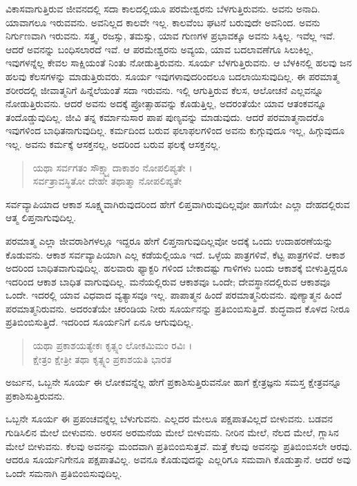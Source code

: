 ವಿಕಾಸವಾಗುತ್ತಿರುವ ಜೀವನದಲ್ಲಿ ಸದಾ ಕಾಲದಲ್ಲಿಯೂ ಪರಮೇಶ್ವರನು ಬೆಳಗುತ್ತಿರುವನು. ಅವನು ಅನಾದಿ. ಯಾವಾಗಲೂ ಇರುವವನು. ಅವನಿಲ್ಲದ ಕಾಲವೇ ಇಲ್ಲ. ಕಾಲವೆಂಬ ಘಟನೆ ಬರುವುದೇ ಅವನಿಂದ. ಅವನು ನಿರ್ಗುಣವಾಗಿ ಇರುವನು. ಸತ್ತ್ವ, ರಜಸ್ಸು, ತಮಸ್ಸು, ಯಾವ ಗುಣಗಳ ಪ್ರಭಾವಕ್ಕೂ ಅವನು ಸಿಕ್ಕಿಲ್ಲ. ಇವೆಲ್ಲ ಇವೆ. ಆದರೆ ಅವನನ್ನು ಬಂಧಿಸಲಾರದೆ ಇವೆ. ಆ ಪರಮೇಶ್ವರನು ಅವ್ಯಯ, ಯಾವ ಬದಲಾವಣೆಗೂ ಸಿಲುಕಿಲ್ಲ, ಇವುಗಳನ್ನೆಲ್ಲ ಕೇವಲ ಸಾಕ್ಷಿಯಂತೆ ನಿಂತು ನೋಡುತ್ತಿರುವನು. ಸೂರ್ಯ ಬೆಳಗುತ್ತಿರುವನು. ಆ ಬೆಳಕಿನಲ್ಲಿ ಹಲವು ಜನ ಹಲವು ಕೆಲಸಗಳನ್ನು ಮಾಡುತ್ತಿರುವರು. ಸೂರ್ಯ ಇವುಗಳಾವುದರಿಂದಲೂ ಬದಲಾಯಿಸುವುದಿಲ್ಲ. ಈ ಪರಮಾತ್ಮ ಶರೀರದಲ್ಲಿ ಜೀವಾತ್ಮನಿಗೆ ಹಿನ್ನೆಲೆಯಂತೆ ಸದಾ ಇರುವನು. ಇಲ್ಲಿ ಆಗುತ್ತಿರುವ ಕೆಲಸ, ಆಲೋಚನೆ ಎಲ್ಲವನ್ನೂ ನೋಡುತ್ತಿರುವನು. ಆದರೆ ಅವನು ಅದಕ್ಕೆ ಪ್ರೋತ್ಸಾಹವನ್ನು ಕೊಡುತ್ತಿಲ್ಲ, ಅದರಂತೆಯೇ ಯಾವ ಆತಂಕವನ್ನೂ ತಂದೊಡ್ಡುವುದಿಲ್ಲ. ಜೀವಿ ತನ್ನ ಕರ್ಮಾನುಸಾರ ಪಾಪ ಪುಣ್ಯವನ್ನು ಮಾಡುವುದು. ಆದರೆ ಪರಮಾತ್ಮನಾದರೊ ಇವುಗಳಿಂದ ಬಾಧಿತನಾಗುವುದಿಲ್ಲ. ಕರ್ಮದಿಂದ ಬರುವ ಫಲಾಫಲಗಳಿಂದ ಅವನು ಕುಗ್ಗುವುದೂ ಇಲ್ಲ, ಹಿಗ್ಗುವುದೂ ಇಲ್ಲ. ಅವನು ಕರ್ಮಕ್ಕೆ ಆಸಕ್ತನಲ್ಲ, ಅದರಿಂದ ಬರುವ ಫಲಕ್ಕೆ ಆಸಕ್ತನಲ್ಲ.

\begin{verse}
ಯಥಾ ಸರ್ವಗತಂ ಸೌಕ್ಷ್ಮ್ಯಾದಾಕಾಶಂ ನೋಪಲಿಪ್ಯತೇ ।\\ಸರ್ವತ್ರಾವಸ್ಥಿತೋ ದೇಹೇ ತಥಾತ್ಮಾ ನೋಪಲಿಪ್ಯತೇ 
\end{verse}

{\small ಸರ್ವವ್ಯಾಪಿಯಾದ ಆಕಾಶ ಸೂಕ್ಷ್ಮವಾಗಿರುವುದರಿಂದ ಹೇಗೆ ಲಿಪ್ತವಾಗಿರುವುದಿಲ್ಲವೋ ಹಾಗೆಯೇ ಎಲ್ಲಾ ದೇಹದಲ್ಲಿರುವ ಆತ್ಮ ಲಿಪ್ತನಾಗುವುದಿಲ್ಲ.}

ಪರಮಾತ್ಮ ಎಲ್ಲಾ ಜೀವರಾಶಿಗಳಲ್ಲೂ ಇದ್ದರೂ ಹೇಗೆ ಲಿಪ್ತನಾಗುವುದಿಲ್ಲವೋ ಅದಕ್ಕೆ ಒಂದು ಉದಾಹರಣೆಯನ್ನು ಕೊಡುವನು. ಆಕಾಶ ಸರ್ವವ್ಯಾಪಿಯಾಗಿ ಎಲ್ಲ ಕಡೆಯಲ್ಲಿಯೂ ಇದೆ. ಒಳ್ಳೆಯ ಪಾತ್ರಗಳಿವೆ, ಕೆಟ್ಟ ಪಾತ್ರಗಳಿವೆ. ಆಕಾಶ ಅದರಿಂದ ಬಾಧಿತವಾಗುವುದಿಲ್ಲ. ಹಲವಾರು ಫ್ಯಾಕ್ಟರಿ ಗಳಿಂದ ಬೇಕಾದಷ್ಟು ಗಾಳಿಗಳು ಬಂದು ಆಕಾಶಕ್ಕೆ ಬೀಳುತ್ತಿದ್ದರೂ ಇದರಿಂದ ಆಕಾಶ ಬಾಧಿತ ವಾಗುವುದಿಲ್ಲ. ಮನೆಯಲ್ಲಿರುವ ಆಕಾಶವೂ ಒಂದೇ; ದೇವಸ್ಥಾನದಲ್ಲಿರುವ ಆಕಾಶವೂ ಒಂದೇ. ಇದರಲ್ಲಿ ಯಾವ ವಿಧವಾದ ವ್ಯತ್ಯಾಸವೂ ಇಲ್ಲ. ಪಾಪಾತ್ಮನ ಹಿಂದೆ ಪರಮಾತ್ಮನಿರುವನು. ಪುಣ್ಯಾತ್ಮನ ಹಿಂದೆ ಪರಮಾತ್ಮನಿರುವನು. ಅದರಂತೆಯೇ ಚರಂಡಿಯ ನೀರು ಸೂರ್ಯನನ್ನು ಪ್ರತಿಬಿಂಬಿಸುತ್ತಿದೆ. ಶುದ್ಧವಾದ ಕೊಳದ ನೀರೂ ಪ್ರತಿಬಿಂಬಿಸುತ್ತಿದೆ. ಇದರಿಂದ ಸೂರ್ಯನಿಗೆ ಏನೂ ಆಗುವುದಿಲ್ಲ.

\begin{verse}
ಯಥಾ ಪ್ರಕಾಶಯತ್ಯೇಕಃ ಕೃತ್ಸ್ನಂ ಲೋಕಮಿಮಂ ರವಿಃ ।\\ಕ್ಷೇತ್ರಂ ಕ್ಷೇತ್ರೀ ತಥಾ ಕೃತ್ಸ್ನಂ ಪ್ರಕಾಶಯತಿ ಭಾರತ 
\end{verse}

{\small ಅರ್ಜುನ, ಒಬ್ಬನೇ ಸೂರ್ಯ ಈ ಲೋಕವನ್ನೆಲ್ಲ ಹೇಗೆ ಪ್ರಕಾಶಿಸುತ್ತಿರುವನೋ ಹಾಗೆ ಕ್ಷೇತ್ರಜ್ಞನು ಸಮಸ್ತ ಕ್ಷೇತ್ರವನ್ನೂ ಪ್ರಕಾಶಿಸುತ್ತಿರುವನು.}

ಒಬ್ಬನೇ ಸೂರ್ಯ ಈ ಪ್ರಪಂಚವನ್ನೆಲ್ಲ ಬೆಳುಗುವನು. ಎಲ್ಲದರ ಮೇಲೂ ಪಕ್ಷಪಾತವಿಲ್ಲದೆ ಬೀಳುವನು. ಬಡವನ ಗುಡಿಸಿಲಿನ ಮೇಲೆ ಬೀಳುವನು. ಅರಸನ ಅರಮನೆಯ ಮೇಲೆ ಬೀಳುವನು. ನೀರಿನ ಮೇಲೆ, ನೆಲದ ಮೇಲೆ, ಗ್ಲಾಸಿನ ಮೇಲೆ ಬೀಳುವನು. ಕೆಲವು ಅವನನ್ನು ಮಂದವಾಗಿ ಪ್ರತಿಬಿಂಬಿಸುತ್ತವೆ. ಮತ್ತೆ ಕೆಲವು ಅವನನ್ನು ಪ್ರತಿಬಿಂಬಿಸಲೇ ಆರವು. ಆದರೂ ಸೂರ್ಯನಿಗೇನೂ ಪಕ್ಷಪಾತವಿಲ್ಲ. ಅವನೂ ಕೊಡುವುದನ್ನು ಎಲ್ಲರಿಗೂ ಸಮವಾಗಿ ಕೊಡುತ್ತಾನೆ. ಆದರೆ ಅವು ಒಂದೇ ಸಮನಾಗಿ ಪ್ರತಿಬಿಂಬಿಸುವುದಿಲ್ಲ.

